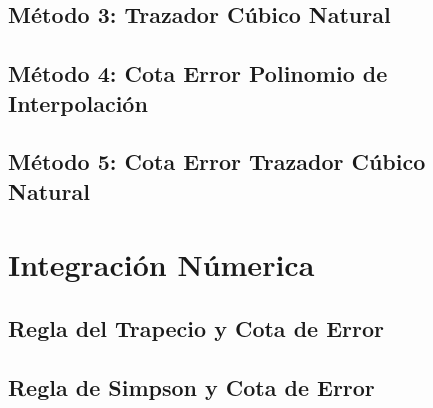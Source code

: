 \documentclass[10pt,a4paper]{article}
\begin{document}
		
	
	\subsection{Método 3: Trazador Cúbico Natural}
	
	
	
	\subsection{Método 4: Cota Error Polinomio de Interpolación}
	
	
	
	\subsection{Método 5: Cota Error Trazador Cúbico Natural}

	
	
	\section{Integración Númerica}
	
	\subsection{Regla del Trapecio y Cota de Error}
	
	

	\subsection{Regla de Simpson y Cota de Error}
	
\end{document}
